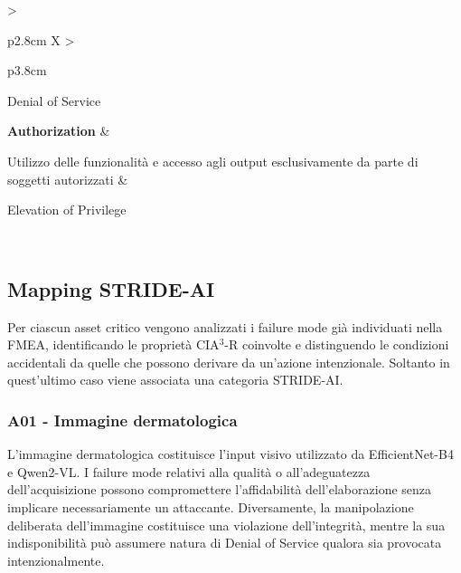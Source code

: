{\begin{xltabular}{\textwidth}{
    >{\raggedright\arraybackslash}p{2.8cm}
    X
    >{\raggedright\arraybackslash}p{3.8cm}
}
Denial of Service \\

\midrule


\textbf{Authorization} &

Utilizzo delle funzionalità e accesso agli output esclusivamente da parte di
soggetti autorizzati &

Elevation of Privilege \\

\bottomrule

\caption{Proprietà CIA$^3$-R e corrispondenza con le categorie STRIDE-AI}

\label{tab:cia3r-stride}\\

\end{xltabular}
}

\subsection{Mapping STRIDE-AI}
Per ciascun asset critico vengono analizzati i failure mode già individuati nella FMEA, identificando le proprietà CIA$^3$-R coinvolte e distinguendo le condizioni accidentali da quelle che possono derivare da un'azione intenzionale. Soltanto in quest'ultimo caso viene associata una categoria STRIDE-AI.

\subsubsection{A01 - Immagine dermatologica}
L'immagine dermatologica costituisce l'input visivo utilizzato da EfficientNet-B4 e Qwen2-VL. I failure mode relativi alla qualità o all'adeguatezza dell'acquisizione possono compromettere l'affidabilità dell'elaborazione senza implicare necessariamente un attaccante. Diversamente, la manipolazione deliberata dell'immagine costituisce una violazione dell'integrità, mentre la sua indisponibilità può assumere natura di Denial of Service qualora sia provocata intenzionalmente.





